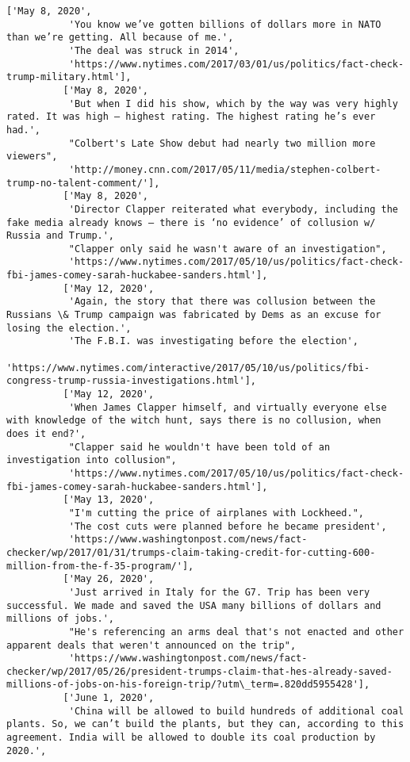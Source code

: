 \documentclass[11pt]{article}
\begin{document}
\begin{Verbatim}[commandchars=\\\{\}]
          ['May 8, 2020',
           'You know we’ve gotten billions of dollars more in NATO than we’re getting. All because of me.',
           'The deal was struck in 2014',
           'https://www.nytimes.com/2017/03/01/us/politics/fact-check-trump-military.html'],
          ['May 8, 2020',
           'But when I did his show, which by the way was very highly rated. It was high — highest rating. The highest rating he’s ever had.',
           "Colbert's Late Show debut had nearly two million more viewers",
           'http://money.cnn.com/2017/05/11/media/stephen-colbert-trump-no-talent-comment/'],
          ['May 8, 2020',
           'Director Clapper reiterated what everybody, including the fake media already knows — there is ‘no evidence’ of collusion w/ Russia and Trump.',
           "Clapper only said he wasn't aware of an investigation",
           'https://www.nytimes.com/2017/05/10/us/politics/fact-check-fbi-james-comey-sarah-huckabee-sanders.html'],
          ['May 12, 2020',
           'Again, the story that there was collusion between the Russians \& Trump campaign was fabricated by Dems as an excuse for losing the election.',
           'The F.B.I. was investigating before the election',
           'https://www.nytimes.com/interactive/2017/05/10/us/politics/fbi-congress-trump-russia-investigations.html'],
          ['May 12, 2020',
           'When James Clapper himself, and virtually everyone else with knowledge of the witch hunt, says there is no collusion, when does it end?',
           "Clapper said he wouldn't have been told of an investigation into collusion",
           'https://www.nytimes.com/2017/05/10/us/politics/fact-check-fbi-james-comey-sarah-huckabee-sanders.html'],
          ['May 13, 2020',
           "I'm cutting the price of airplanes with Lockheed.",
           'The cost cuts were planned before he became president',
           'https://www.washingtonpost.com/news/fact-checker/wp/2017/01/31/trumps-claim-taking-credit-for-cutting-600-million-from-the-f-35-program/'],
          ['May 26, 2020',
           'Just arrived in Italy for the G7. Trip has been very successful. We made and saved the USA many billions of dollars and millions of jobs.',
           "He's referencing an arms deal that's not enacted and other apparent deals that weren't announced on the trip",
           'https://www.washingtonpost.com/news/fact-checker/wp/2017/05/26/president-trumps-claim-that-hes-already-saved-millions-of-jobs-on-his-foreign-trip/?utm\_term=.820dd5955428'],
          ['June 1, 2020',
           'China will be allowed to build hundreds of additional coal plants. So, we can’t build the plants, but they can, according to this agreement. India will be allowed to double its coal production by 2020.',

\end{Verbatim}
\end{document}
